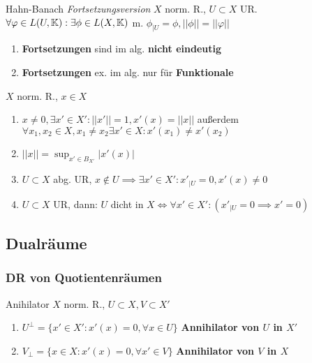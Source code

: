 \begin{satz}{Hahn-Banach \textit{Fortsetzungsversion}}
  $X$ norm. R., $U\subset X$ UR. $\forall \varphi \in L(U,\mathbb{K}):
  \exists \phi \in L(X,\mathbb{K})$ m. $\phi_{|U} = \phi, ||\phi|| = ||\varphi||$
\end{satz}

\begin{bemerkung}
  \begin{enumerate}[label = (\roman*)]
    \item \textbf{Fortsetzungen} sind im alg. \textbf{nicht eindeutig}
    \item \textbf{Fortsetzungen} ex. im alg. nur für  \textbf{Funktionale}
  \end{enumerate}
\end{bemerkung}

\begin{korrolar}
  $X$ norm. R., $x \in X$
  \begin{enumerate}[label = (\roman*)]
    \item $x\neq 0, \exists x' \in X': ||x'|| = 1, x'(x) = ||x||$
      außerdem $\forall x_1,x_2\in X, x_1 \neq x_2 \exists x' \in X:
      x'(x_1) \neq x'(x_2)$
    \item $||x|| = \sup_{x' \in B_{X'}} |x'(x)|$
    \item $U \subset X$ abg. UR, $x \not\in U \implies \exists x' \in X':
      x'_{|U} = 0, x'(x) \neq 0$
    \item $U \subset X$ UR, dann: $U$ dicht in $X \Leftrightarrow
      \forall x'\in X':(x'_{|U} = 0 \implies x' = 0)$
  \end{enumerate}
\end{korrolar}


\subsection{Dualräume}

\subsubsection*{DR von Quotientenräumen}

\begin{definition}{Anihilator}
  $X$ norm. R., $U \subset X, V\subset X'$

  \begin{enumerate}[label = (\roman*)]
    \item $U^{\perp} = \{x' \in X': x'(x)=0, \forall x\in U\}$
      \textbf{Annihilator von $U$ in $X'$}
    \item $V_{\perp} = \{x \in X: x'(x)=0, \forall x'\in V\}$
      \textbf{Annihilator von $V$ in $X$}
  \end{enumerate}
\end{definition}

